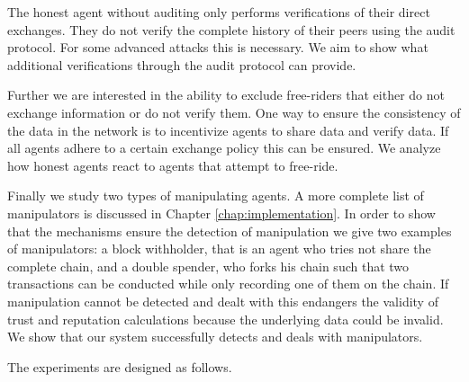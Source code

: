 The honest agent without auditing only performs verifications of their direct exchanges. They do not
verify the complete history of their peers using the audit protocol. For some advanced attacks this
is necessary. We aim to show what additional verifications through the audit protocol can provide. 

Further we are interested in the ability to exclude free-riders that either do not exchange 
information or do not verify them. One way to ensure the consistency of the data in the network is 
to incentivize agents to share data and verify data. If all agents adhere to a certain exchange policy
this can be ensured. We analyze how honest agents react to agents that attempt to free-ride.

Finally we study two types of manipulating agents. A more complete list of manipulators is discussed
in Chapter \ref{chap:implementation}. In order to show that the mechanisms ensure the detection of 
manipulation we give two examples of manipulators: a block withholder, that is an agent who tries not 
share the complete chain, and a double spender, who forks his chain such that two transactions can 
be conducted while only recording one of them on the chain. If manipulation cannot be detected and
dealt with this endangers the validity of trust and reputation calculations because the underlying 
data could be invalid. We show that our system successfully detects and deals with manipulators.


The experiments are designed as follows.

